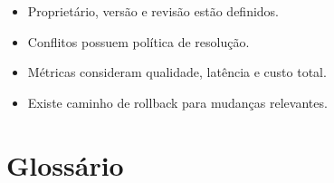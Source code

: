 \documentclass[
  10pt,
  a4paper,
  oneside]{book}
\providecommand{\tightlist}{%
  \setlength{\itemsep}{0pt}\setlength{\parskip}{0pt}}
\begin{document}
\begin{itemize}
\tightlist
\item[$\square$]
  Proprietário, versão e revisão estão definidos.
\item[$\square$]
  Conflitos possuem política de resolução.
\item[$\square$]
  Métricas consideram qualidade, latência e custo total.
\item[$\square$]
  Existe caminho de rollback para mudanças relevantes.
\end{itemize}

\normalsize

\newpage

\hypertarget{glossuxe1rio}{%
\chapter{Glossário}\label{glossuxe1rio}}

\footnotesize
\end{document}
